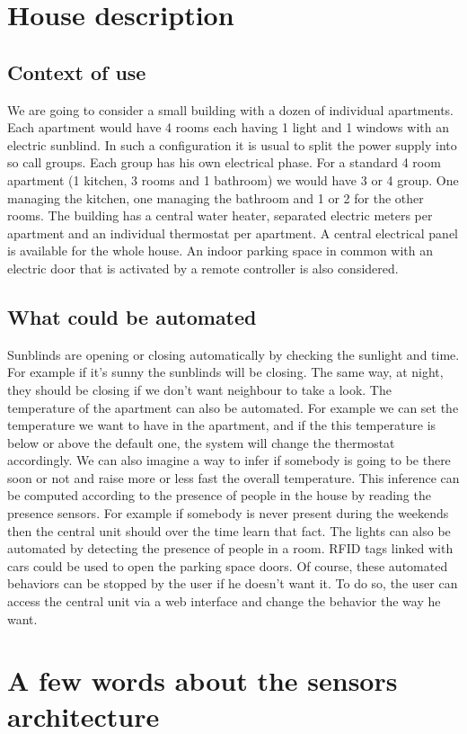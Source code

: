 \documentclass{acm_proc_article-sp}
\begin{document}
\section{House description}
\subsection{Context of use}
We are going to consider a small building with a dozen of individual apartments. 
Each apartment would have 4 rooms each having 1 light and 1 windows with an electric sunblind. 
In such a configuration it is usual to split the power supply into so call groups. 
Each group has his own electrical phase. 
For a standard 4 room apartment (1 kitchen, 3 rooms and 1 bathroom) we would have 3 or 4 group. One managing the kitchen, one managing the bathroom and 1 or 2 for the other rooms. 
The building has a central water heater, separated electric meters per apartment and an individual thermostat per apartment. 
A central electrical panel is available for the whole house. An indoor parking space in common with an electric door that is activated by a remote controller is also considered.
\subsection{What could be automated}
Sunblinds are opening or closing automatically by checking the sunlight and time. 
For example if it's sunny the sunblinds will be closing. The same way, at night, they should be closing if we don't want neighbour to take a look.
The temperature of the apartment can also be automated. For example we can set the temperature we want to have in the apartment, 
and if the this temperature is below or above the default one, the system will change the thermostat accordingly. 
We can also imagine a way to infer if somebody is going to be there soon or not and raise more or less fast the overall temperature. 
This inference can be computed according to the presence of people in the house by reading the presence sensors. 
For example if somebody is never present during the weekends then the central unit should over the time learn that fact.
The lights can also be automated by detecting the presence of people in a room.
RFID tags linked with cars could be used to open the parking space doors.
Of course, these automated behaviors can be stopped by the user if he doesn't want it. 
To do so, the user can access the central unit via a web interface and change the behavior the way he want.

	
\section{A few words about the sensors architecture}
\end{document}
